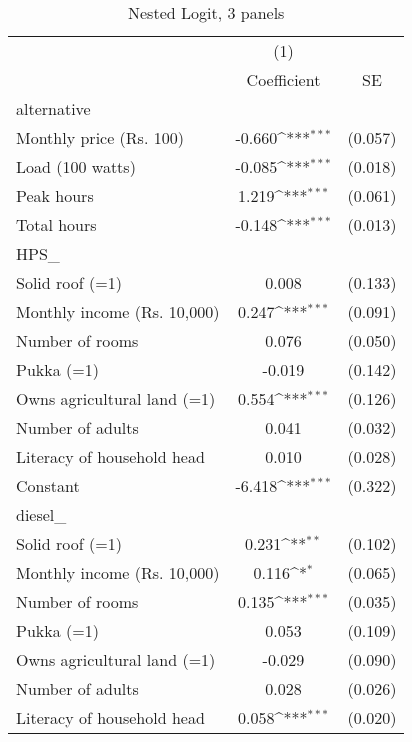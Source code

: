 \begin{table}[htbp]\centering
\def\sym#1{\ifmmode^{#1}\else\(^{#1}\)\fi}
\caption{Nested Logit, 3 panels}
\begin{tabular}{l*{1}{cc}}
\toprule
                    &\multicolumn{1}{c}{(1)}         &            \\
                    & Coefficient         &          SE\\
\midrule
alternative         &                     &            \\
Monthly price (Rs. 100)&      -0.660\sym{***}&     (0.057)\\
Load (100 watts)    &      -0.085\sym{***}&     (0.018)\\
Peak hours          &       1.219\sym{***}&     (0.061)\\
Total hours         &      -0.148\sym{***}&     (0.013)\\
\midrule
HPS\_                &                     &            \\
Solid roof (=1)     &       0.008         &     (0.133)\\
Monthly income (Rs. 10,000)&       0.247\sym{***}&     (0.091)\\
Number of rooms     &       0.076         &     (0.050)\\
Pukka (=1)          &      -0.019         &     (0.142)\\
Owns agricultural land (=1)&       0.554\sym{***}&     (0.126)\\
Number of adults    &       0.041         &     (0.032)\\
Literacy of household head&       0.010         &     (0.028)\\
Constant            &      -6.418\sym{***}&     (0.322)\\
\midrule
diesel\_             &                     &            \\
Solid roof (=1)     &       0.231\sym{**} &     (0.102)\\
Monthly income (Rs. 10,000)&       0.116\sym{*}  &     (0.065)\\
Number of rooms     &       0.135\sym{***}&     (0.035)\\
Pukka (=1)          &       0.053         &     (0.109)\\
Owns agricultural land (=1)&      -0.029         &     (0.090)\\
Number of adults    &       0.028         &     (0.026)\\
Literacy of household head&       0.058\sym{***}&     (0.020)\\

\end{tabular}
\end{table}
